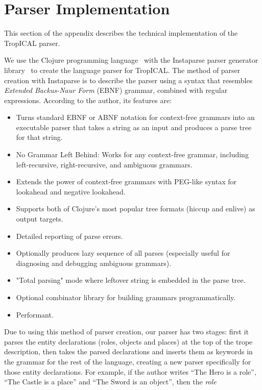\documentclass[11pt]{report}
\begin{document}
\chapter{Parser Implementation}
\label{appendix:t-grammar}
This section of the appendix describes the technical implementation of the TropICAL parser.

We use the Clojure programming language~\citep{clojure} with the Instaparse
parser generator library~\citep{instaparse} to create the language parser for
TropICAL. The method of parser creation with Instaparse is to describe the
parser using a syntax that resembles \emph{Extended Backus-Naur Form} (EBNF)
grammar, combined with regular expressions. According to the author, its
features are:

\begin{itemize}
\item Turns standard EBNF or ABNF notation for context-free grammars into an executable parser that takes a string as an input and produces a parse tree for that string.
\item No Grammar Left Behind: Works for any context-free grammar, including left-recursive, right-recursive, and ambiguous grammars.
\item Extends the power of context-free grammars with PEG-like syntax for lookahead and negative lookahead.
\item Supports both of Clojure's most popular tree formats (hiccup and enlive) as output targets.
\item Detailed reporting of parse errors.
\item Optionally produces lazy sequence of all parses (especially useful for diagnosing and debugging ambiguous grammars).
\item "Total parsing" mode where leftover string is embedded in the parse tree.
\item Optional combinator library for building grammars programmatically.
\item Performant.
\end{itemize}

Due to using this method of parser creation, our parser has two stages: first it
parses the entity declarations (roles, objects and places) at the top of the
trope description, then takes the parsed declarations and inserts them as
keywords in the grammar for the rest of the language, creating a new parser
specifically for those entity declarations. For example, if the author writes
``The Hero is a role'', ``The Castle is a place'' and ``The Sword is an
object'', then the \emph{role} 
\end{document}
